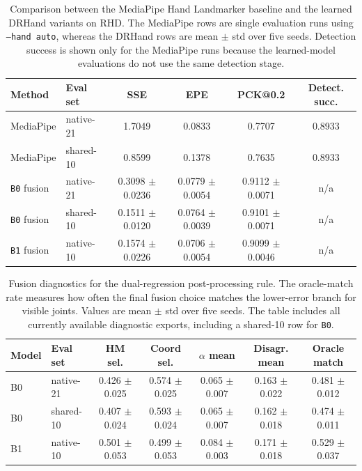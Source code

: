 \documentclass[10pt,letterpaper]{article}
\begin{document}
\begin{table}[H]
\centering
\footnotesize
\caption{Comparison between the MediaPipe Hand Landmarker baseline and the learned DRHand variants on RHD. The MediaPipe rows are single evaluation runs using \texttt{--hand auto}, whereas the DRHand rows are mean $\pm$ std over five seeds. Detection success is shown only for the MediaPipe runs because the learned-model evaluations do not use the same detection stage.}
\label{tab:mediapipe_baseline}
\begin{tabular}{llcccc}
\toprule
Method & Eval set & SSE & EPE & PCK@0.2 & Detect. succ. \\
\midrule
MediaPipe & native-21 & 1.7049 & 0.0833 & 0.7707 & 0.8933 \\
MediaPipe & shared-10 & 0.8599 & 0.1378 & 0.7635 & 0.8933 \\
\texttt{B0} fusion & native-21 & 0.3098 $\pm$ 0.0236 & 0.0779 $\pm$ 0.0054 & 0.9112 $\pm$ 0.0071 & n/a \\
\texttt{B0} fusion & shared-10 & 0.1511 $\pm$ 0.0120 & 0.0764 $\pm$ 0.0039 & 0.9101 $\pm$ 0.0071 & n/a \\
\texttt{B1} fusion & native-10 & 0.1574 $\pm$ 0.0226 & 0.0706 $\pm$ 0.0054 & 0.9099 $\pm$ 0.0046 & n/a \\
\bottomrule
\end{tabular}
\end{table}

\begin{table}[H]
\centering
\footnotesize
\caption{Fusion diagnostics for the dual-regression post-processing rule. The oracle-match rate measures how often the final fusion choice matches the lower-error branch for visible joints. Values are mean $\pm$ std over five seeds. The table includes all currently available diagnostic exports, including a shared-10 row for \texttt{B0}.}
\label{tab:fusion_diagnostics}
\begin{tabular}{llccccc}
\toprule
Model & Eval set & HM sel. & Coord sel. & $\alpha$ mean & Disagr. mean & Oracle match \\
\midrule
B0 & native-21 & 0.426 $\pm$ 0.025 & 0.574 $\pm$ 0.025 & 0.065 $\pm$ 0.007 & 0.163 $\pm$ 0.022 & 0.481 $\pm$ 0.012 \\
B0 & shared-10 & 0.407 $\pm$ 0.024 & 0.593 $\pm$ 0.024 & 0.065 $\pm$ 0.007 & 0.162 $\pm$ 0.018 & 0.474 $\pm$ 0.011 \\
B1 & native-10 & 0.501 $\pm$ 0.053 & 0.499 $\pm$ 0.053 & 0.084 $\pm$ 0.003 & 0.171 $\pm$ 0.018 & 0.529 $\pm$ 0.037 \\
\bottomrule
\end{tabular}
\end{table}
\end{document}
